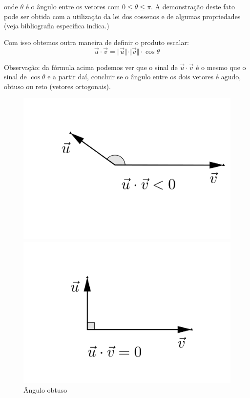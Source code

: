\noindent onde $\theta$ é o ângulo entre os vetores com $0\leq \theta \leq \pi$. A demonstração deste fato pode ser obtida com a utilização da lei dos cossenos e de algumas propriedades (veja bibliografia específica indica.)

Com isso obtemos outra maneira de definir o produto escalar: $$\vec u \cdot \vec v=\Vert \vec u \Vert \cdot \Vert \vec v \Vert \cdot \cos{\theta}$$

Observação: da fórmula acima podemos ver que o sinal de $\vec{u} \cdot \vec{v}$ é o mesmo que o sinal de $\cos{\theta}$ e a partir daí, concluir se o ângulo entre os dois vetores é agudo, obtuso ou reto (vetores ortogonais).

\begin{figure}[H]
\begin{minipage}[b]{0.3\linewidth}
\includegraphics[width=\linewidth]{analitica/imagens/angvetores1.png}
\caption{Ângulo obtuso}
\end{minipage} \hfill
\begin{minipage}[b]{0.3\linewidth}
\includegraphics[width=\linewidth]{analitica/imagens/angvetores2.png}

\end{minipage}
\end{figure}
